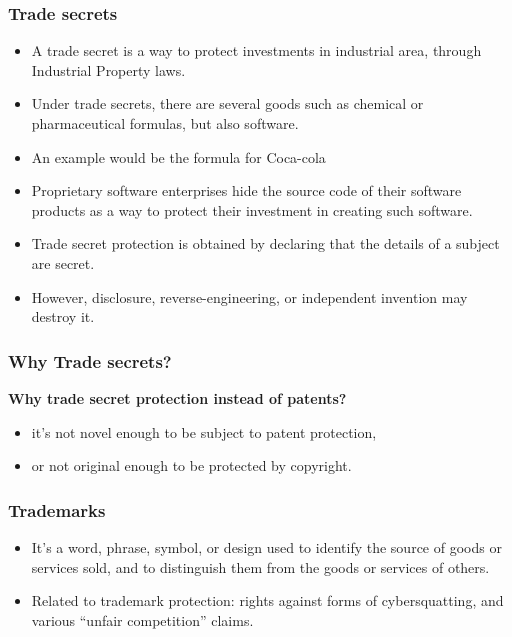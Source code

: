 \documentclass{beamer}
\begin{document}
\begin{frame}
\frametitle{Trade secrets}

\begin{itemize}
\item A trade secret is a way to protect investments in industrial area,
through Industrial Property laws.
\item Under trade secrets, there are several goods such as chemical or pharmaceutical
formulas, but also software.
\item An example would be the formula for Coca-cola
\item Proprietary software enterprises hide the source code of their
software products as a way to protect their investment in creating
such software.
\item Trade secret protection is obtained by declaring that the details
of a subject are secret.
\item However, disclosure, reverse-engineering, or independent invention may destroy it.
\end{itemize}

\end{frame}


\begin{frame}
\frametitle{Why Trade secrets?}

\begin{center}
\textbf{Why trade secret protection instead of patents?}
\end{center}

\pause

\begin{itemize}
\item it's not novel enough to be subject to patent protection, 
\item or not original enough to be protected by copyright.
\end{itemize}

\end{frame}



\begin{frame}
\frametitle{Trademarks}

\begin{itemize}
\item It's a word, phrase, symbol, or design used to identify
the source of goods or services sold, and to distinguish them from the
goods or services of others. 
\item Related to trademark protection: rights against forms of cybersquatting, 
and various ``unfair competition'' claims.
\end{itemize}

\end{frame}
\end{document}
